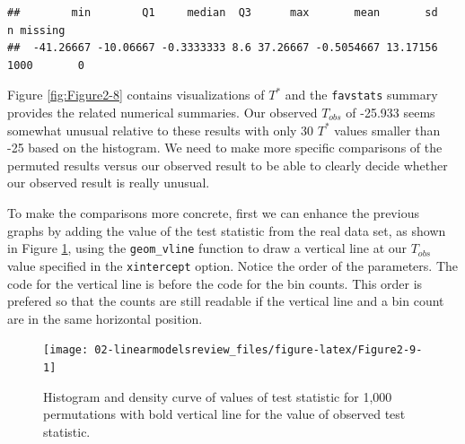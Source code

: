 \documentclass[
]{book}
\begin{document}
\begin{verbatim}
##        min        Q1     median  Q3      max       mean       sd    n missing
##  -41.26667 -10.06667 -0.3333333 8.6 37.26667 -0.5054667 13.17156 1000       0
\end{verbatim}

\normalsize

Figure \ref{fig:Figure2-8} contains visualizations of \(T^*\) and the \texttt{favstats}
summary provides the related numerical summaries. Our observed \(T_{obs}\)
of -25.933 seems somewhat unusual relative to these results with only
30 \(T^*\) values smaller than -25 based on the
histogram. We need to make more specific comparisons of the permuted results
versus our observed result to be able to clearly decide whether our observed
result is really unusual.

\indent To make the comparisons more concrete, first we can enhance the previous graphs
by adding the value of the test statistic from the real data set, as shown in
Figure \ref{fig:Figure2-9}, using the \texttt{geom\_vline}  function to draw a vertical
line at our \(T_{obs}\) value specified in the \texttt{xintercept} option. Notice the
order of the parameters. The code for the vertical line is before the code for
the bin counts. This order is prefered so that the counts are still readable if
the vertical line and a bin count are in the same horizontal position.



\begin{figure}[ht!]

{\centering \texttt{[image: 02-linearmodelsreview\_files/figure-latex/Figure2-9-1]} 

}

\caption{Histogram and density curve of values of test statistic for 1,000 permutations with bold vertical line for the value of observed test statistic.}\label{fig:Figure2-9}
\end{figure}

\small
\end{document}
